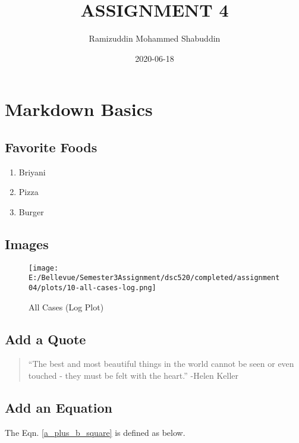 \documentclass[
]{article}
\title{ASSIGNMENT 4}
\author{Ramizuddin Mohammed Shabuddin}
\date{2020-06-18}
\providecommand{\tightlist}{%
  \setlength{\itemsep}{0pt}\setlength{\parskip}{0pt}}
\begin{document}
\maketitle

\hypertarget{markdown-basics}{%
\section{Markdown Basics}\label{markdown-basics}}

\hypertarget{favorite-foods}{%
\subsection{Favorite Foods}\label{favorite-foods}}

\begin{enumerate}
\def\labelenumi{\arabic{enumi}.}
\tightlist
\item
  Briyani
\item
  Pizza
\item
  Burger
\end{enumerate}

\hypertarget{images}{%
\subsection{Images}\label{images}}

\begin{figure}
\centering
\texttt{[image: E:/Bellevue/Semester3Assignment/dsc520/completed/assignment04/plots/10-all-cases-log.png]}
\caption{All Cases (Log Plot)}
\end{figure}

\hypertarget{add-a-quote}{%
\subsection{Add a Quote}\label{add-a-quote}}

\begin{quote}
``The best and most beautiful things in the world cannot be seen or even
touched - they must be felt with the heart.'' -Helen Keller
\end{quote}

\hypertarget{add-an-equation}{%
\subsection{Add an Equation}\label{add-an-equation}}

The Eqn. \ref{a_plus_b_square} is defined as below.
\end{document}
